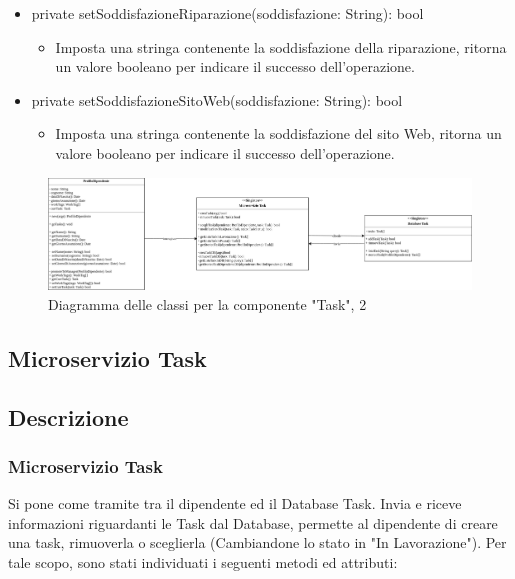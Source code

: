\documentclass{report}
\begin{document}
\begin{itemize}
\begin{itemize}
\end{itemize}
\item private setSoddisfazioneRiparazione(soddisfazione: String): bool
\begin{itemize}
	\item Imposta una stringa contenente la soddisfazione della riparazione, ritorna un valore booleano per indicare il successo dell'operazione.
\end{itemize}
\item private setSoddisfazioneSitoWeb(soddisfazione: String): bool
\begin{itemize}
	\item Imposta una stringa contenente la soddisfazione del sito Web, ritorna un valore booleano per indicare il successo dell'operazione.
\end{itemize}
\end{itemize}





\begin{figure}[H]
	\centering\includegraphics[width=1.2\textwidth]{images/Diagramma_delle_classi_task2.png}
	Diagramma delle classi per la componente "Task", 2
\end{figure}
\subsection{Microservizio Task}
\subsection*{Descrizione}

\subsubsection*{Microservizio Task}
Si pone come tramite tra il dipendente ed il Database Task. Invia e riceve informazioni riguardanti le Task dal Database, permette al dipendente di creare una task, rimuoverla o sceglierla (Cambiandone lo stato in "In Lavorazione"). Per tale scopo, sono stati individuati i seguenti metodi ed attributi:
\end{document}
